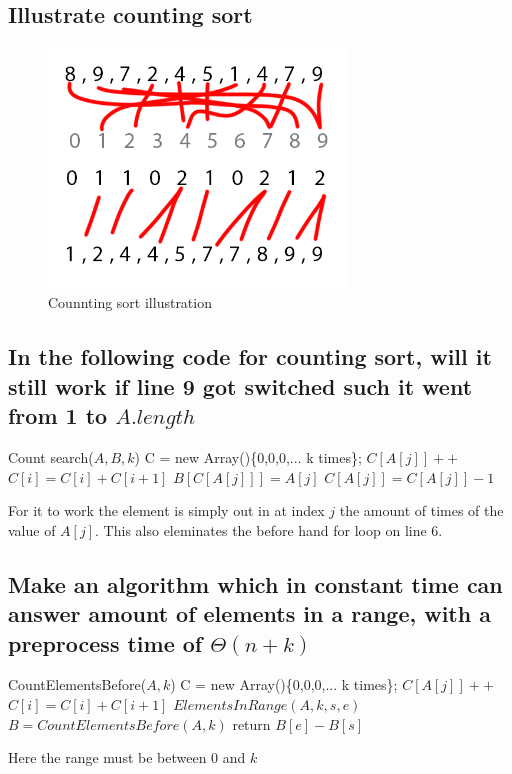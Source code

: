 \documentclass[12pt, a4paper]{article}
\begin{document}
			\subsection{Illustrate counting sort}
				\begin{figure}
					\center
					\includegraphics[width=300px]{assets/Week9Exercise2.png}
					\caption{Counnting sort illustration}
				\end{figure}
			\subsection{In the following code for counting sort, will it still work if line 9 got switched such it went from 1 to $A.length$}
				\begin{algorithmic}[1]
					\State Count search($A,B,k$)
					\State C = new Array()\{0,0,0,... k times\};
						\State $C[A[j]]++$ 
					\EndFor
						\State $C[i] = C[i] + C[i+1]$
					\EndFor
						\State $B[C[A[j]]] = A[j]$
						\State $C[A[j]] = C[A[j]] -1$
					\EndFor
				\end{algorithmic}
				For it to work the element is simply out in at index $j$ the amount of times of the value of $A[j]$. This also eleminates the before hand for loop on line 6.
			\subsection{Make an algorithm which in constant time can answer amount of elements in a range, with a preprocess time of $\Theta(n+k)$}
				\begin{algorithmic}[1]
					\State CountElementsBefore($A,k$)
					\State C = new Array()\{0,0,0,... k times\};
						\State $C[A[j]]++$ 
					\EndFor
						\State $C[i] = C[i] + C[i+1]$
					\EndFor
					\State $ElementsInRange(A,k,s,e)$
					\State $B = CountElementsBefore(A,k)$
					\State return $B[e]-B[s]$
				\end{algorithmic}
				Here the range must be between 0 and $k$
\end{document}

